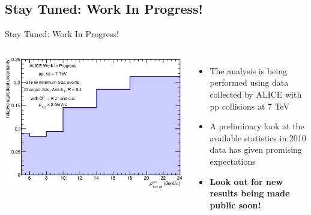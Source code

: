 \documentclass[xcolor={usenames,dvipsnames}]{beamer}
\begin{document}
\subsection*{Stay Tuned: Work In Progress!}
\begin{frame}{Stay Tuned: Work In Progress!}
\begin{columns}
\includegraphics[width=\textwidth]{img/HQ16_WorkInProgress_StatisticalUncertainty}
\begin{itemize}
\item The analysis is being performed using data collected by ALICE with pp collisions at 7 TeV
\item A preliminary look at the available statistics in 2010 data has given promising expectations
\item \textbf{\alert{Look out for new results being made public soon!}}
\end{itemize}
\end{columns}
\end{frame}


\end{document}
